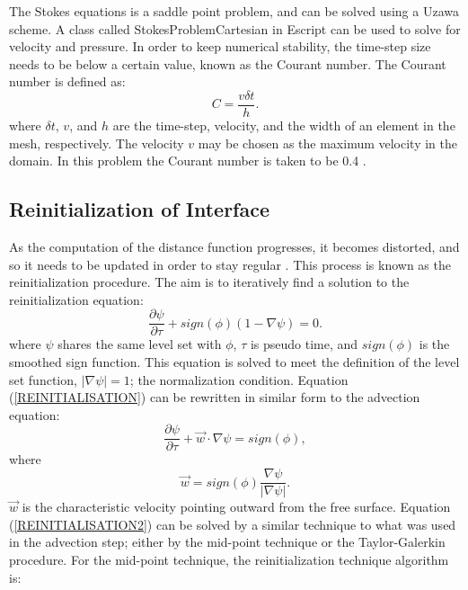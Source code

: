 The Stokes equations is a saddle point problem, and can be solved using a Uzawa scheme. A class called StokesProblemCartesian in Escript can be used to solve for velocity and pressure.
In order to keep numerical stability, the time-step size needs to be below a certain value, known as the Courant number. The Courant number is defined as:
%
\begin{equation}
C = \frac{v \delta t}{h}.
\label{COURANT}
\end{equation}
%
where $\delta t$, $v$, and $h$ are the time-step, velocity, and the width of an element in the mesh, respectively. The velocity $v$ may be chosen as the maximum velocity in the domain. In this problem the Courant number is taken to be 0.4 \cite{BOURGOUIN2006}.


\subsection{Reinitialization of Interface}

As the computation of the distance function progresses, it becomes distorted, and so it needs to be updated in order to stay regular \cite{SUSSMAN1994}. This process is known as the reinitialization procedure. The aim is to iteratively find a solution to the reinitialization equation:
%
\begin{equation}
\frac{\partial \psi}{\partial \tau} + sign(\phi)(1 - \nabla \psi) = 0.
\label{REINITIALISATION}
\end{equation}
%
where $\psi$ shares the same level set with $\phi$, $\tau$ is pseudo time, and $sign(\phi)$ is the smoothed sign function. This equation is solved to meet the definition of the level set function, $\lvert \nabla \psi \rvert = 1$; the normalization condition. Equation (\ref{REINITIALISATION}) can be rewritten in similar form to the advection equation:
%
\begin{equation}
\frac{\partial \psi}{\partial \tau} + \vec{w} \cdot \nabla \psi = sign(\phi),
\label{REINITIALISATION2}
\end{equation}
%
where
%
\begin{equation}
\vec{w} = sign(\phi)\frac{\nabla \psi}{|\nabla \psi|}.
\label{REINITIALISATION3}
\end{equation}
%
$\vec{w}$ is the characteristic velocity pointing outward from the free surface. Equation (\ref{REINITIALISATION2}) can be solved by a similar technique to what was used in the advection step; either by the mid-point technique \cite{BOURGOUIN2006} or the Taylor-Galerkin procedure. For the mid-point technique, the reinitialization technique algorithm is:

